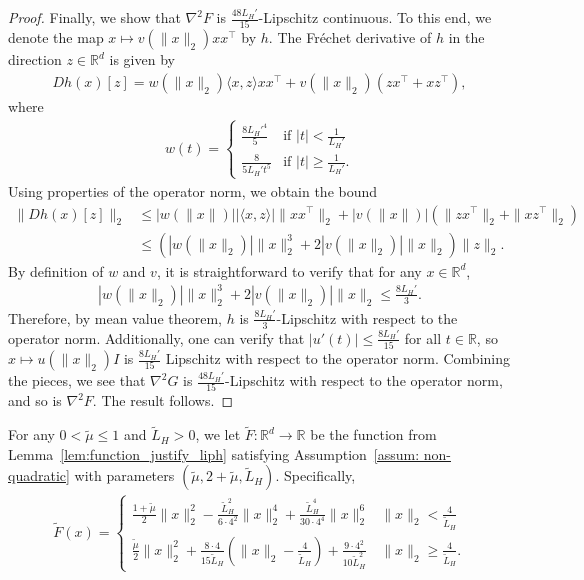 \documentclass[11pt,twoside]{article}
\numberwithin{equation}{section}
\newcommand{\RR}{\mathbb{R}}
\newcommand{\1}{\mathbf{1}}
\theoremstyle{remark}
\theoremstyle{plain}
\newcommand{\liph}{L_H}
\begin{document}
\begin{proof}
	Finally, we show that $\nabla^2  F$ is $\frac{48\liph'}{15}$-Lipschitz continuous. To this end, we denote the map $x \mapsto v(\|x\|_2) xx^\top$ by $h$. The Fr\'echet derivative of $h$ in the direction \(z\in\mathbb{R}^d\) is given by
	\begin{align*}
		Dh(x)[z] = w(\|x\|_2) \langle x, z \rangle xx^\top + v(\|x\|_2)\left(zx^\top + xz^\top\right),
	\end{align*}
	where 
	\begin{align*}
		w(t) = \begin{cases}
			\frac{8\liph'^4 }{5}  & \text{if } |t| < \frac{1}{\liph'}\\
			\frac{8}{5 \liph' t^5}  & \text{if } |t| \ge \frac{1}{\liph'}. 
		\end{cases}
	\end{align*}
	Using properties of the operator norm, we obtain the bound
	\begin{align*}
		\|Dh(x)[z]\|_2 & \le |w(\|x\|)| |\langle x, z \rangle| \|xx^\top\|_2 + |v(\|x\|)|\left(\|zx^\top\|_2+\|xz^\top\|_2\right)\\
		&\le \left(|w(\|x\|_2)| \|x\|_2^3 + 2|v(\|x\|_2)| \|x\|_2  \right)\|z\|_2.
	\end{align*}
	By definition of $w$ and $v$, it is straightforward to verify that for any $x \in \RR^d$,
	\begin{align*}
		|w(\|x\|_2)| \|x\|_2^3 + 2|v(\|x\|_2)| \|x\|_2 \le \frac{8 \liph'}{3}.
	\end{align*}
	Therefore, by mean value theorem, $h$ is $\frac{8 \liph'}{3}$-Lipschitz with respect to the operator norm. Additionally, one can verify that $|u'(t)| \le \frac{8 \liph'}{15}$  for all $t \in \RR$, so $x \mapsto u(\|x\|_2) I$ is $\frac{8 \liph'}{15}$ Lipschitz with respect to the operator norm. Combining the pieces, we see that $\nabla^2 G$ is $\frac{48\liph'}{15}$-Lipschitz with respect to the operator norm, and so is $\nabla^2  F$. The result follows.
\end{proof}
For any $0 < \tilde \mu  \le 1$ and $\tilde L_H >0$, we let $\tilde F \colon \RR^d \rightarrow \RR$ be the function from Lemma~\ref{lem:function_justify_liph} satisfying Assumption~\ref{assum: non-quadratic} with parameters $(\tilde\mu, 2+\tilde\mu, \tilde L_H)$. Specifically, 
\begin{align}\label{eqn:function_justify_liph}
	\tilde F(x) = \begin{cases}
		\frac{1 + \tilde \mu}{2} \|x\|_2^2 - \frac{\tilde L_H^2}{6\cdot 4^2} \|x\|_2^4 + \frac{\tilde L_H^4}{30 \cdot 4^4} \|x\|_2^6 & \|x\|_2< \frac{4}{\tilde L_H}\\
		\frac{\tilde \mu}{2} \|x\|_2^2 + \frac{8 \cdot 4}{15\tilde L_H} \left(\|x\|_2 - \frac{4}{\tilde L_H}\right) + \frac{9\cdot 4^2}{10 \tilde L_H^2} & \|x\|_2 \ge \frac{4}{\tilde L_H}.
	\end{cases}
\end{align}
\end{document}
